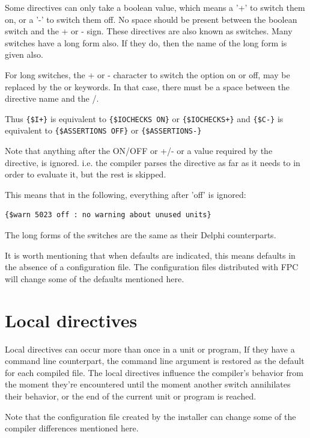 Some directives can only take a boolean value, which means a '+' to switch them on,
or a '-' to switch them off. No space should be present between the boolean
switch and the + or - sign. These directives are also known as switches.
Many switches have a long form also. If they do, then the name of the
long form is given also. 

For long switches, the + or - character to switch the option on or off, 
may be replaced by the  or  keywords. In that case, there
must be a space between the directive name and the /.

Thus \verb|{$I+}| is equivalent to \verb|{$IOCHECKS ON}| or
\verb|{$IOCHECKS+}| and
\verb|{$C-}| is equivalent to \verb|{$ASSERTIONS OFF}| or
\verb|{$ASSERTIONS-}|

Note that anything after the ON/OFF or +/- or a value required by the
directive, is ignored. i.e. the compiler parses the directive as far as it
needs to in order to evaluate it, but the rest is skipped.

This means that in the following, everything after 'off' is ignored:
\begin{verbatim}
{$warn 5023 off : no warning about unused units}
\end{verbatim}

The long forms of the switches are the same as their Delphi
counterparts.



It is worth mentioning that when defaults are indicated, this means defaults
in the absence of a configuration file. The configuration files distributed
with FPC will change some of the defaults mentioned here.




\section{Local directives}
\label{se:LocalSwitch}
Local directives can occur more than once in a unit or program,
If they have a command line counterpart, the command line argument is
restored as the default for each compiled file. The local directives
influence the compiler's behavior from the moment they're encountered
until the moment another switch annihilates their behavior, or the end
of the current unit or program is reached.

Note that the configuration file created by the installer can change some of
the compiler differences mentioned here.

